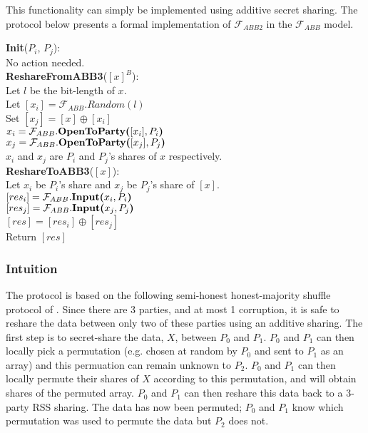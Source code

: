 This functionality can simply be implemented using additive secret sharing.
The protocol below presents a formal implementation of $\mathcal{F}_{ABB2}$
in the $\mathcal{F}_{ABB}$ model.

\begin{protocol}
	\textbf{Init}($P_i$, $P_j$):\\
		\indent	No action needed. \\

	\noindent \textbf{ReshareFromABB3}($[x]^B$): \\
		\indent	Let $l$ be the bit-length of $x$.\\
		\indent Let $[x_i] = \mathcal{F}_{ABB}.Random(l)$\\
		\indent Set $[x_j] = [x] \oplus [x_i]$\\
		\indent $x_i = \mathcal{F}_{ABB}.\textbf{OpenToParty(}[x_i], P_i\textbf{)}$\\
		\indent $x_j = \mathcal{F}_{ABB}.\textbf{OpenToParty(}[x_j], P_j\textbf{)}$\\
		\indent $x_i$ and $x_j$ are $P_i$ and $P_j$'s shares of $x$ respectively.\\
		
	\noindent \textbf{ReshareToABB3}($[x]$): \\
		\indent Let $x_i$ be $P_i$'s share and $x_j$ be $P_j$'s share of $[x]$.\\
		\indent $[res_i] = \mathcal{F}_{ABB}.\textbf{Input(}x_i, P_i\textbf{)}$\\
		\indent $[res_j] = \mathcal{F}_{ABB}.\textbf{Input(}x_j, P_j\textbf{)}$\\
		\indent $[res] = [res_i] \oplus [res_j]$\\
		\indent Return $[res]$\\
\end{protocol}

\subsubsection{Intuition}

The protocol is based on the following semi-honest honest-majority shuffle protocol of 
\cite{EPRINT:LauWilZha11}.
Since there are 3 parties, and at most 1 corruption, it is safe to reshare
the data between only two of these parties using an additive sharing.
The first step is to secret-share the data, $X$, between $P_0$ and $P_1$.
$P_0$ and $P_1$ can then locally pick a permutation
(e.g. chosen at random by $P_0$ and sent to $P_1$ as an array)
and this permuation can remain unknown to $P_2$.
$P_0$ and $P_1$ can then locally permute their shares of $X$ according to 
this permutation, and will obtain shares of the permuted array.
$P_0$ and $P_1$ can then reshare this data back to a 3-party RSS sharing.
The data has now been permuted; $P_0$ and $P_1$ know which permutation
was used to permute the data but $P_2$ does not.

